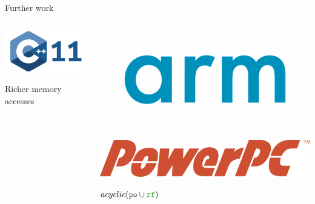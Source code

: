 \begin{frame}{Further work}
  \begin{columns}
    \begin{column}{0.4\linewidth}
      \begin{center}
      \includegraphics[width=0.6\linewidth]{cpp11.png}

      Richer memory accesses
    \end{center}
    \end{column}
    \begin{column}{0.4\linewidth}

      \vspace{0.5cm}
      
      \begin{minipage}[c]{0.45\textwidth}
        \includegraphics[width=1.0\linewidth]{arm.png}
      \end{minipage}
      \hfill
      \begin{minipage}[c]{0.45\textwidth}
        \includegraphics[width=1.0\linewidth]{power.png}
      \end{minipage}
            
      \begin{center}
      {\large \sout{$acyclic(\lPO \cup \lRF)$}}
    \end{center}
    \end{column}
    
  \end{columns}
  
\end{frame}


